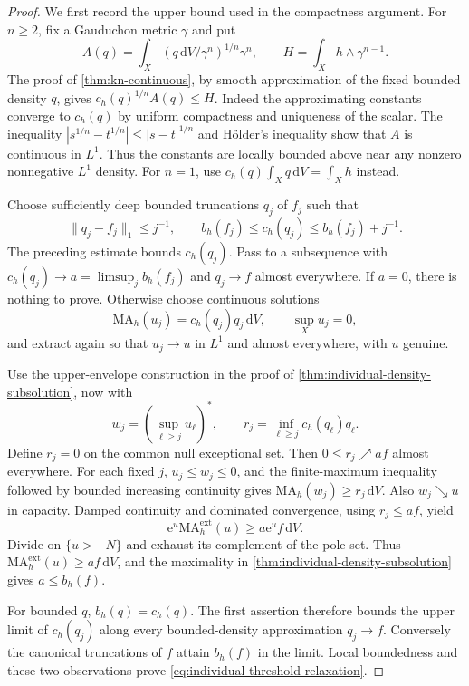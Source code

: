 \begin{proof}
We first record the upper bound used in the compactness argument. For $n\geq2$, fix a Gauduchon metric $\gamma$ and put
\[
 A(q)=\int_X(q\,\mathrm{d}V/\gamma^n)^{1/n}\gamma^n,
 \qquad H=\int_Xh\wedge\gamma^{n-1}.
\]
The proof of \cref{thm:kn-continuous}, by smooth approximation of the fixed bounded density $q$, gives
$c_h(q)^{1/n}A(q)\leq H$. Indeed the approximating constants converge to $c_h(q)$ by uniform compactness and uniqueness of the scalar. The inequality
$|s^{1/n}-t^{1/n}|\leq|s-t|^{1/n}$ and H\"older's inequality show that $A$ is continuous in $L^1$. Thus the constants are locally bounded above near any nonzero nonnegative $L^1$ density. For $n=1$, use $c_h(q)\int_Xq\,\mathrm{d}V=\int_Xh$ instead.

Choose sufficiently deep bounded truncations $q_j$ of $f_j$ such that
\[
 \|q_j-f_j\|_1\leq j^{-1},\qquad
 b_h(f_j)\leq c_h(q_j)\leq b_h(f_j)+j^{-1}.
\]
The preceding estimate bounds $c_h(q_j)$. Pass to a subsequence with
$c_h(q_j)\to a=\limsup_jb_h(f_j)$ and $q_j\to f$ almost everywhere. If $a=0$, there is nothing to prove. Otherwise choose continuous solutions
\[
 \mathrm{MA}_h(u_j)=c_h(q_j)q_j\,\mathrm{d}V,
 \qquad \sup_Xu_j=0,
\]
and extract again so that $u_j\to u$ in $L^1$ and almost everywhere, with $u$ genuine.

Use the upper-envelope construction in the proof of \cref{thm:individual-density-subsolution}, now with
\[
 w_j=\left(\sup_{\ell\geq j}u_\ell\right)^*,
 \qquad r_j=\inf_{\ell\geq j}c_h(q_\ell)q_\ell.
\]
Define $r_j=0$ on the common null exceptional set. Then $0\leq r_j\nearrow af$ almost everywhere. For each fixed $j$, $u_j\leq w_j\leq0$, and the finite-maximum inequality followed by bounded increasing continuity gives
$\mathrm{MA}_h(w_j)\geq r_j\,\mathrm{d}V$. Also $w_j\searrow u$ in capacity. Damped continuity and dominated convergence, using $r_j\leq af$, yield
\[
 \mathrm{e}^{u}\mathrm{MA}^{\mathrm{ext}}_h(u)
      \geq a\mathrm{e}^{u}f\,\mathrm{d}V.
\]
Divide on $\{u>-N\}$ and exhaust its complement of the pole set. Thus
$\mathrm{MA}^{\mathrm{ext}}_h(u)\geq af\,\mathrm{d}V$, and the maximality in \cref{thm:individual-density-subsolution} gives $a\leq b_h(f)$.

For bounded $q$, $b_h(q)=c_h(q)$. The first assertion therefore bounds the upper limit of $c_h(q_j)$ along every bounded-density approximation $q_j\to f$. Conversely the canonical truncations of $f$ attain $b_h(f)$ in the limit. Local boundedness and these two observations prove \eqref{eq:individual-threshold-relaxation}.
\end{proof}

